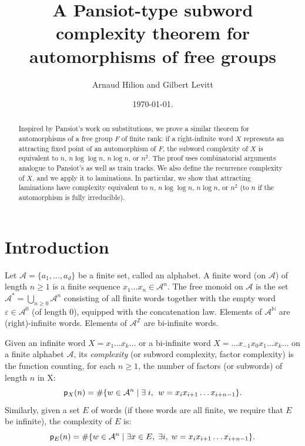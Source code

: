 \documentclass[11pt]{amsart}
\theoremstyle{remark}
\newcommand{\cp}{{\sf  p}}
\newcommand{\Z}{{\mathbb {Z}}}
\newcommand {\N} {{\mathbb {N}}}
\begin{document}
\title{A Pansiot-type subword complexity theorem for automorphisms of free groups}
\author{Arnaud Hilion and Gilbert Levitt}
\date{\today. 
}

\maketitle

\begin{abstract}
Inspired by Pansiot's work on substitutions, we prove a similar theorem for automorphisms of a free group $F$ of finite rank: if  a right-infinite word $X$ represents an attracting  fixed point of an automorphism of $F$,   the subword complexity of $X$ is equivalent to $n$, $n\log \log n$, $n\log n$, or $n^2$. The proof uses combinatorial arguments analogue to Pansiot's as well as  train tracks. We also define the recurrence complexity of $X$, and we apply it to laminations. In particular, we show that attracting laminations have complexity equivalent to $n$, $n\log \log n$, $n\log n$, or $n^2$ (to $n$ if the automorphism is fully irreducible).
\end{abstract}
  
 \section{Introduction}
 
 
 
 
   Let $\mathcal A =\{a_1,\dots,a_d\}$ be a finite set, called an alphabet.
 A finite word (on $\mathcal A$) of length $n\geq 1$ is a finite sequence $x_1\dots x_n \in \mathcal A ^n$. 
  The free monoid on $\mathcal A$ is the set $\mathcal A^* = \bigcup_{n\ge0 
 } \mathcal A^n$ consisting of all   finite words together with the empty word $\varepsilon\in \mathcal A^0$ (of length 0), 
 equipped with the concatenation law.
 Elements of $\mathcal A ^\N$ are    (right)-infinite words. Elements of $\mathcal A ^\Z$ are bi-infinite words.

 Given an infinite word $X=x_1\dots x_k \dots$ or a bi-infinite word $X= \dots x_{-1}x_0x_1\dots x_k \dots$ on a finite alphabet $\mathcal A$, its {\em complexity} (or subword complexity, factor complexity) is the function counting,   for each $n\ge1$, the number of factors (or subwords) of length $n$ in X:
 \begin{equation*}\label{eq:complexity}
 \cp_X(n)=\#\{ w\in \mathcal A^n \;|\; \exists\; i,\, \; w=x_ix_{i+1}\dots x_{i+n-1} \}.
 \end{equation*}
Similarly, given a set $E$ of words (if these words are all finite, we require that $E$ be infinite), the complexity of $E$ is:
 \begin{equation*}\label{eq:complexity}
 \cp_E(n)=\#\{ w\in \mathcal A^n \;|\; \exists x\in E, \; \exists i, \; w=x_ix_{i+1}\dots x_{i+n-1} \}.
 \end{equation*}
 
\end{document}
